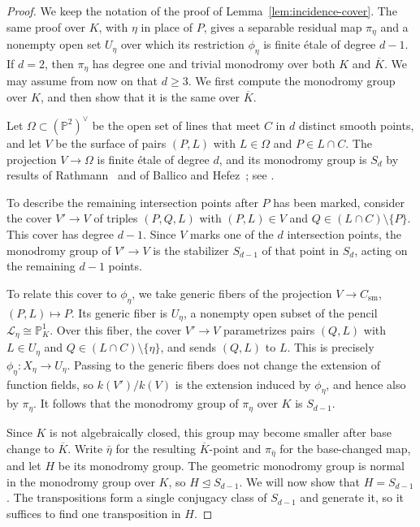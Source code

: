 \documentclass[12pt,reqno]{amsart}
\theoremstyle{definition}
\theoremstyle{remark}
\newcommand{\bP}{\mathbb{P}}
\begin{document}
\begin{proof}
We keep the notation of the proof of Lemma~\ref{lem:incidence-cover}. The same proof over $K$, with $\eta$ in place of $P$, gives a separable residual map $\pi_\eta$ and a nonempty open set $U_\eta$ over which its restriction $\phi_\eta$ is finite \'etale of degree $d-1$. If $d=2$, then $\pi_\eta$ has degree one and trivial monodromy over both $K$ and $\overline K$. We may assume from now on that $d\geq3$. We first compute the monodromy group over $K$, and then show that it is the same over $\overline K$.

Let $\Omega\subset(\bP^2)^\vee$ be the open set of lines that meet $C$ in $d$ distinct smooth points, and let $V$ be the surface of pairs $(P,L)$ with $L\in\Omega$ and $P\in L\cap C$. The projection $V\to\Omega$ is finite \'etale of degree $d$, and its monodromy group is $S_d$ by results of Rathmann~\cite{Rat87} and of Ballico and Hefez~\cite{BH86}; see \cite[Theorem~2]{Ent21}. 

To describe the remaining intersection points after $P$ has
been marked, consider the cover $V'\to V$ of triples $(P,Q,L)$
with $(P,L)\in V$ and $Q\in(L\cap C)\setminus\{P\}$.
This cover has degree $d-1$. Since $V$ marks one of the $d$
intersection points, the monodromy group of $V'\to V$ is the
stabilizer $S_{d-1}$ of that point in $S_d$, acting on the
remaining $d-1$ points.

To relate this cover to $\phi_\eta$, we take generic fibers
of the projection $V\to C_{\mathrm{sm}}$, $(P,L)\mapsto P$.
Its generic fiber is $U_\eta$, a nonempty open subset of the pencil
$\mathcal L_\eta\cong\bP^1_K$. Over this fiber, the cover
$V'\to V$ parametrizes pairs $(Q,L)$ with $L\in U_\eta$ and
$Q\in(L\cap C)\setminus\{\eta\}$, and sends $(Q,L)$ to $L$.
This is precisely $\phi_\eta\colon X_\eta\to U_\eta$.
Passing to the generic fibers does not change the extension
of function fields, so $k(V')/k(V)$ is the extension induced
by $\phi_\eta$, and hence also by $\pi_\eta$.
It follows that the monodromy group of $\pi_\eta$ over $K$ is $S_{d-1}$.

Since $K$ is not algebraically closed, this group may become smaller after base change to $\overline K$. Write $\bar\eta$ for the resulting $\overline K$-point and $\pi_{\bar\eta}$ for the base-changed map, and let $H$ be its monodromy group. The geometric monodromy group is normal in the monodromy group over $K$, so $H\trianglelefteq S_{d-1}$. We will now show that $H=S_{d-1}$. The transpositions form a single conjugacy class of $S_{d-1}$ and generate it, so it suffices to find one transposition in $H$.


\end{proof}
\end{document}
